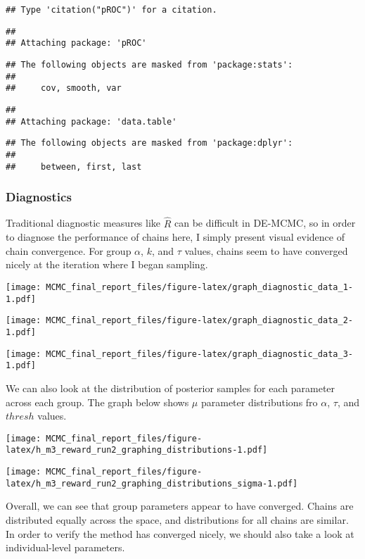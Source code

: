 \documentclass[]{article}
\begin{document}
\begin{verbatim}
## Type 'citation("pROC")' for a citation.
\end{verbatim}

\begin{verbatim}
## 
## Attaching package: 'pROC'
\end{verbatim}

\begin{verbatim}
## The following objects are masked from 'package:stats':
## 
##     cov, smooth, var
\end{verbatim}

\begin{verbatim}
## 
## Attaching package: 'data.table'
\end{verbatim}

\begin{verbatim}
## The following objects are masked from 'package:dplyr':
## 
##     between, first, last
\end{verbatim}

\subsubsection{Diagnostics}\label{diagnostics}

Traditional diagnostic measures like \(\hat{R}\) can be difficult in
DE-MCMC, so in order to diagnose the performance of chains here, I
simply present visual evidence of chain convergence. For group
\(\alpha\), \(k\), and \(\tau\) values, chains seem to have converged
nicely at the iteration where I began sampling.

\texttt{[image: MCMC\_final\_report\_files/figure-latex/graph\_diagnostic\_data\_1-1.pdf]}

\texttt{[image: MCMC\_final\_report\_files/figure-latex/graph\_diagnostic\_data\_2-1.pdf]}

\texttt{[image: MCMC\_final\_report\_files/figure-latex/graph\_diagnostic\_data\_3-1.pdf]}

We can also look at the distribution of posterior samples for each
parameter across each group. The graph below shows \(\mu\) parameter
distributions fro \(\alpha\), \(\tau\), and \(thresh\) values.

\texttt{[image: MCMC\_final\_report\_files/figure-latex/h\_m3\_reward\_run2\_graphing\_distributions-1.pdf]}

\texttt{[image: MCMC\_final\_report\_files/figure-latex/h\_m3\_reward\_run2\_graphing\_distributions\_sigma-1.pdf]}

Overall, we can see that group parameters appear to have converged.
Chains are distributed equally across the space, and distributions for
all chains are similar. In order to verify the method has converged
nicely, we should also take a look at individual-level parameters.
\end{document}
